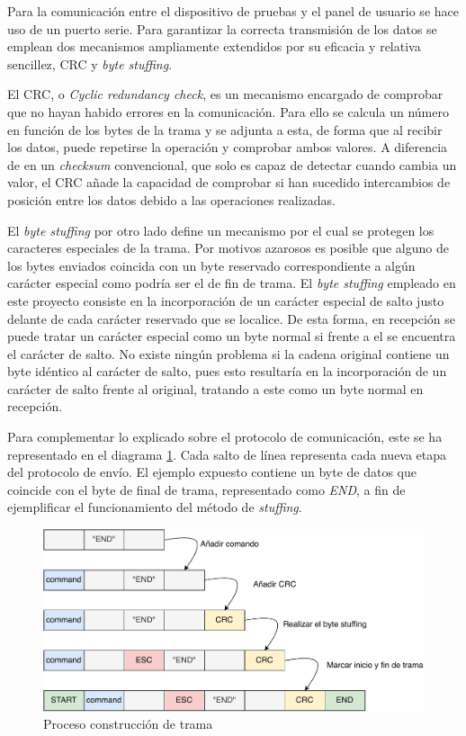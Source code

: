         Para la comunicación entre el dispositivo de pruebas y el panel de usuario se hace uso de un puerto serie. Para garantizar la correcta transmisión de los datos se emplean dos mecanismos ampliamente extendidos por su eficacia y relativa sencillez, CRC y \textit{byte stuffing}. 
        
        El CRC, o \textit{Cyclic redundancy check},  es un mecanismo encargado de comprobar que no hayan habido errores en la comunicación. Para ello se calcula un número en función de los bytes de la trama y se adjunta a esta, de forma que al recibir los datos, puede repetirse la operación y comprobar ambos valores. A diferencia de en un \textit{checksum} convencional, que solo es capaz de detectar cuando cambia un valor, el CRC añade la capacidad de comprobar si han sucedido intercambios de posición entre los datos debido a las operaciones realizadas.
        
        El \textit{byte stuffing} por otro lado define un mecanismo por el cual se protegen los caracteres especiales de la trama. Por motivos azarosos es posible que alguno de los bytes enviados coincida con un byte reservado correspondiente a algún carácter especial  como podría ser el de fin de trama. El \textit{byte stuffing} empleado en este proyecto consiste en la incorporación de un carácter especial de salto justo delante de cada carácter reservado que se localice. De esta forma, en recepción se puede tratar un carácter especial como un byte normal si frente a el se encuentra el carácter de salto. No existe ningún problema si la cadena original contiene un byte idéntico al carácter de salto, pues esto resultaría en la incorporación de un carácter de salto frente al original, tratando a este como un byte normal en recepción.
        
        Para complementar lo explicado sobre el protocolo de comunicación, este se ha representado en el diagrama \ref{fig:frame}. Cada salto de línea representa cada nueva etapa del protocolo de envío. El ejemplo expuesto contiene un byte de datos que coincide con el byte de final de trama, representado como \textit{END}, a fin de ejemplificar el funcionamiento del método de \textit{stuffing}.

        \begin{figure}[H]
                \centering
                        \includegraphics[width = \linewidth]{figuras/ProtocoloCom.pdf}
                \caption{Proceso construcción de trama}
                \label{fig:frame}
        \end{figure}

